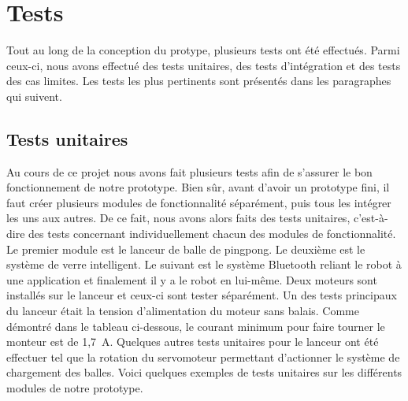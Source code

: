 \section{Tests}


Tout au long de la conception du protype, plusieurs tests ont été effectués.
Parmi ceux-ci, nous avons effectué des tests unitaires, des tests d'intégration et des tests des cas limites.
Les tests les plus pertinents sont présentés dans les paragraphes qui suivent.

\subsection{Tests unitaires}

Au cours de ce projet nous avons fait plusieurs tests afin de s’assurer le bon fonctionnement de notre prototype.
Bien sûr, avant d’avoir un prototype fini, il faut créer plusieurs modules de fonctionnalité séparément, puis tous les intégrer les uns aux autres.
De ce fait, nous avons alors faits des tests unitaires, c’est-à-dire des tests concernant individuellement chacun des modules de fonctionnalité.
Le premier module est le lanceur de balle de pingpong.
Le deuxième est le système de verre intelligent.
Le suivant est le système Bluetooth reliant le robot à une application et finalement il y a le robot en lui-même.
Deux moteurs sont installés sur le lanceur et ceux-ci sont tester séparément.
Un des tests principaux du lanceur était la tension d’alimentation du moteur sans balais.
Comme démontré dans le tableau ci-dessous, le courant minimum pour faire tourner le monteur est de 1,7~A.
Quelques autres tests unitaires pour le lanceur ont été effectuer tel que la rotation du servomoteur permettant d’actionner le système de chargement des balles.
Voici quelques exemples de tests unitaires sur les différents modules de notre prototype.


